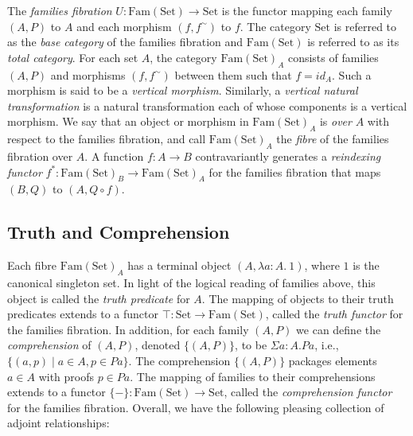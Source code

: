 \documentclass{LMCS}
\newcommand{\sepbar}{\mathrel|}
\newcommand{\Fam}{\mathrm{Fam}}
\newcommand{\Set}{\mathrm{Set}}
\begin{document}
The {\em families fibration} $U : \Fam(\Set) \to \Set$ is the functor
mapping each family $(A,P)$ to $A$ and each morphism $(f,f^{\sim})$ to
$f$. The category $\Set$ is referred to as the {\em base category} of
the families fibration and $\Fam(\Set)$ is referred to as its {\em
  total category}. For each set $A$, the category $\Fam(\Set)_A$
consists of families $(A, P)$ and morphisms $(f, f^\sim)$ between them
such that $f = \mathit{id}_A$. Such a morphism is said to be a {\em
  vertical morphism}. Similarly, a {\em vertical natural
  transformation} is a natural transformation each of whose components
is a vertical morphism. We say that an object or morphism in
$\Fam(\Set)_A$ is {\em over} $A$ with respect to the families
fibration, and call $\Fam(\Set)_A$ the \emph{fibre} of the families
fibration over $A$.  A function $f : A \to B$ contravariantly
generates a \emph{reindexing functor} $f^* : \Fam(\Set)_B \to
\Fam(\Set)_A$ for the families fibration that maps $(B, Q)$ to $(A, Q
\circ f)$.

\subsection{Truth and Comprehension}\label{sec:truth-compr}

Each fibre $\Fam(\Set)_A$ has a terminal object $(A, \lambda a:A.\
1)$, where $1$ is the canonical singleton set.  In light of the
logical reading of families above, this object is called the {\em
  truth predicate} for $A$. The mapping of objects to their truth
predicates extends to a functor $\top : \Set \to \Fam(\Set)$, called
the {\em truth functor} for the families fibration.  In addition, for
each family $(A,P)$ we can define the {\em comprehension} of $(A,P)$,
denoted $\{(A,P)\}$, to be $\Sigma a \!:\! A. Pa$, i.e., $\{ (a,p)
\sepbar a \in A, p \in P a \}$. The comprehension $\{(A,P)\}$ packages
elements $a \in A$ with proofs $p \in Pa$.  The mapping of families to
their comprehensions extends to a functor $\{-\}: \Fam(\Set) \to
\Set$, called the {\em comprehension functor} for the families
fibration. Overall, we have the following pleasing collection of
adjoint relationships:
\end{document}
